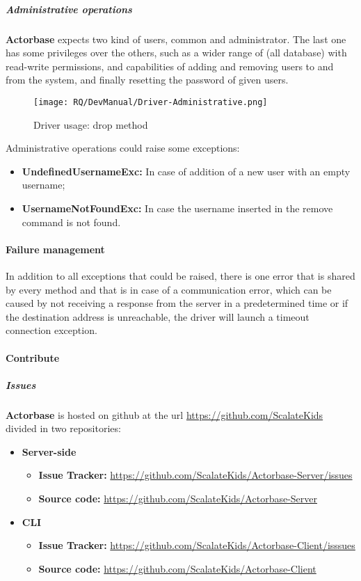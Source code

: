 \documentclass{scalatekids-article}
\begin{document}
\subparagraph{Administrative operations}

\textbf{Actorbase} expects two kind of users, common and administrator. The last one has
some privileges over the others, such as a wider range of  (all
database) with read-write permissions, and capabilities of adding and removing
users to and from the system, and finally resetting the password of given users.
\begin{figure}[H]
  \begin{center}
    \texttt{[image: RQ/DevManual/Driver-Administrative.png]}
    \caption{Driver usage: drop method}
  \end{center}
\end{figure}
Administrative operations could raise some exceptions:
\begin{itemize}
\item \textbf{UndefinedUsernameExc:} In case of addition of a new user with an empty username;
\item \textbf{UsernameNotFoundExc:} In case the username inserted in the remove command is not found.
\end{itemize}

\paragraph{Failure management}

In addition to all exceptions that could be raised, there is one error that is
shared by every method and that is in case of a communication error, which can
be caused by not receiving a response from the server in a predetermined time or
if the destination address is unreachable, the driver will launch a
timeout connection exception.

\paragraph{Contribute}

\subparagraph{Issues}

\textbf{Actorbase} is hosted on github at the url
\url{https://github.com/ScalateKids} divided in two repositories:

\begin{itemize}
\item\textbf{Server-side}
  \begin{itemize}
  \item \textbf{Issue Tracker:} \url{https://github.com/ScalateKids/Actorbase-Server/issues}
  \item \textbf{Source code:} \url{https://github.com/ScalateKids/Actorbase-Server}
  \end{itemize}
\item\textbf{CLI}
  \begin{itemize}
  \item \textbf{Issue Tracker:} \url{https://github.com/ScalateKids/Actorbase-Client/isssues}
  \item \textbf{Source code:} \url{https://github.com/ScalateKids/Actorbase-Client}
  \end{itemize}
\end{itemize}
\end{document}
